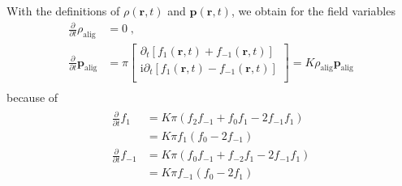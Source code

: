 \documentclass[a4paper, amsfonts, amssymb, amsmath, reprint, showkeys, showpacs, nofootinbib, twoside]{revtex4-2}
\begin{document}
With the definitions of $\rho \left( \mathbf{r},t \right)$ and $\boldsymbol{p}\left( \mathbf{r},t \right)$, we obtain for the field variables
\begin{equation}
    \begin{aligned}
        \frac{\partial}{\partial t}\rho _{\mathrm{alig}}&=0\;,\\
        \frac{\partial}{\partial t}\boldsymbol{p}_{\mathrm{alig}}&=\pi \left[ \begin{array}{c}
        \partial _t\left[ f_1\left( \mathbf{r},t \right) +f_{-1}\left( \mathbf{r},t \right) \right]\\
        \mathrm{i}\partial _t\left[ f_1\left( \mathbf{r},t \right) -f_{-1}\left( \mathbf{r},t \right) \right]\\
    \end{array} \right] =K\rho _{\mathrm{alig}}\boldsymbol{p}_{\mathrm{alig}}\\
    \end{aligned}
\end{equation}
because of
\begin{eqnarray}
    \begin{aligned}
        \frac{\partial}{\partial t}f_1&=K\pi \left( f_2f_{-1}+f_0f_1-2f_{-1}f_1 \right)\\
        &=K\pi f_1\left( f_0-2f_{-1} \right)\\
        \frac{\partial}{\partial t}f_{-1}&=K\pi \left( f_0f_{-1}+f_{-2}f_1-2f_{-1}f_1 \right)\\
        &=K\pi f_{-1}\left( f_0-2f_1 \right)\\
    \end{aligned}
\end{eqnarray}
\end{document}

